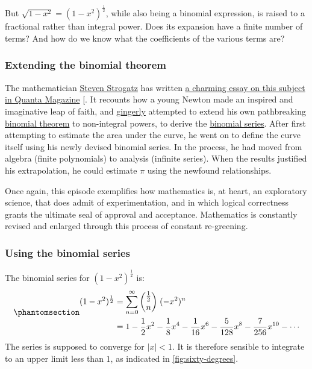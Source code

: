 \documentclass[
  a4paper,
]{article}
\begin{document}
But \(\sqrt{1 - x^2} = (1 - x^2)^{\frac{1}{2}}\), while also being a
binomial expression, is raised to a fractional rather than integral
power. Does its expansion have a finite number of terms? And how do we
know what the coefficients of the various terms are?

\subsubsection{Extending the binomial
theorem}\label{extending-the-binomial-theorem}

The mathematician
\href{https://en.wikipedia.org/wiki/Steven_Strogatz}{Steven Strogatz}
has written
\href{https://www.quantamagazine.org/how-isaac-newton-discovered-the-binomial-power-series-20220831/}{a
charming essay on this subject in Quanta Magazine}
{[}\citeproc{ref-strogatz-newton-2022}{27}{]}. It recounts how a young
Newton made an inspired and imaginative leap of faith, and
\href{https://www.merriam-webster.com/dictionary/gingerly}{gingerly}
attempted to extend his own pathbreaking
\href{https://en.wikipedia.org/wiki/Binomial_theorem}{binomial theorem}
to non-integral powers, to derive the
\href{https://en.wikipedia.org/wiki/Binomial_series}{binomial series}.
After first attempting to estimate the area under the curve, he went on
to define the curve itself using his newly devised binomial series. In
the process, he had moved from algebra (finite polynomials) to analysis
(infinite series). When the results justified his extrapolation, he
could estimate \(\pi\) using the newfound relationships.

Once again, this episode exemplifies how mathematics is, at heart, an
exploratory science, that does admit of experimentation, and in which
logical correctness grants the ultimate seal of approval and acceptance.
Mathematics is constantly revised and enlarged through this process of
constant re-greening.

\subsubsection{Using the binomial
series}\label{using-the-binomial-series}

The binomial series for \((1 - x^2)^{\frac{1}{2}}\) is:
\begin{equation}\phantomsection\label{eq:approx}{
\begin{aligned}
(1 - x^2)^{\frac{1}{2}} &= \sum^{\infty}_{n=0}\binom{\frac{1}{2}}{n}\;(-x^2)^n\\
&= 1 - \frac{1}{2}x^2 - \frac{1}{8}x^4 - \frac{1}{16}x^6 - \frac{5}{128}x^8 - \frac{7}{256}x^{10} - \cdots
\end{aligned}
}\end{equation} The series is supposed to converge for
\(\lvert{x}\rvert < 1\). It is therefore sensible to integrate to an
upper limit less than \(1\), as indicated in \cref{fig:sixty-degrees}.
\end{document}
